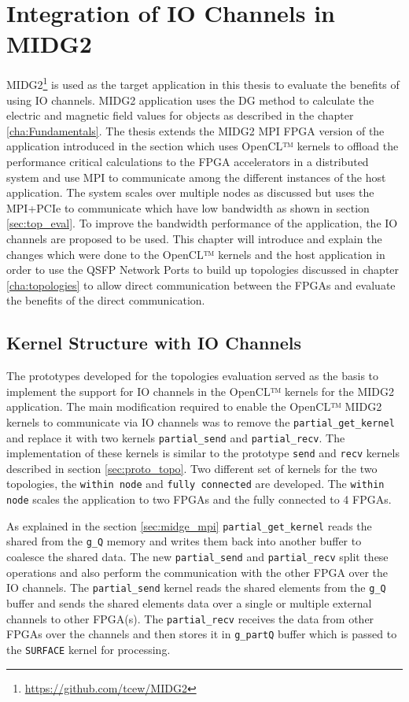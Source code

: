 \chapter{Integration of IO Channels in MIDG2}
\label{cha:sys_arch}

MIDG2\footnote{\url{https://github.com/tcew/MIDG2}} is used as the target
application in this thesis to evaluate the benefits of using IO channels.
MIDG2 application uses the \ac{DG} method to calculate the electric and magnetic
field values for objects as described in the chapter \ref{cha:Fundamentals}.
The thesis extends the MIDG2 MPI FPGA version of the application introduced in the
section \label{sec:midge_mpi} which uses OpenCL™ kernels to
offload the performance critical calculations to the FPGA accelerators in a
distributed system and use MPI to communicate among the different instances of the
host application. The system scales over multiple nodes as discussed but
uses the MPI+PCIe to communicate which have low bandwidth as shown in section
\ref{sec:top_eval}. To improve the bandwidth performance of the application,
the IO channels are proposed to be used. This chapter will
introduce and explain the changes which were done to the OpenCL™ kernels and the
host application in order to use the QSFP Network Ports to build up topologies discussed
in chapter \ref{cha:topologies} to allow direct communication between the FPGAs
and evaluate the benefits of the direct communication.

\section{Kernel Structure with IO Channels}
\label{sec:struc_iochan}

The prototypes developed for the topologies evaluation served as the basis to implement
the support for IO channels in the OpenCL™ kernels for the MIDG2 application. The main
modification required to enable the OpenCL™ MIDG2 kernels to communicate via IO channels
was to remove the \texttt{partial\_get\_kernel} and replace it with two kernels
\texttt{partial\_send} and \texttt{partial\_recv}. The implementation of these kernels
is similar to the prototype \texttt{send} and \texttt{recv} kernels described in
section \ref{sec:proto_topo}. Two different set of kernels for the two topologies,
the \texttt{within node} and \texttt{fully connected} are developed. The \texttt{within node}
scales the application to two FPGAs and the fully connected to 4 FPGAs.

As explained in the section \ref{sec:midge_mpi} \texttt{partial\_get\_kernel} reads
the shared from the \texttt{g\_Q} memory and writes them back into another buffer
to coalesce the shared data. The new \texttt{partial\_send} and \texttt{partial\_recv}
split these operations and also perform the communication with the
other FPGA over the IO channels. The \texttt{partial\_send} kernel reads the
shared elements from the \texttt{g\_Q} buffer and sends the shared elements data
over a single or multiple external channels to other FPGA(s).
The \texttt{partial\_recv} receives the data from other FPGAs over the channels and
then stores it in \texttt{g\_partQ} buffer which is passed to the \texttt{SURFACE}
kernel for processing.

